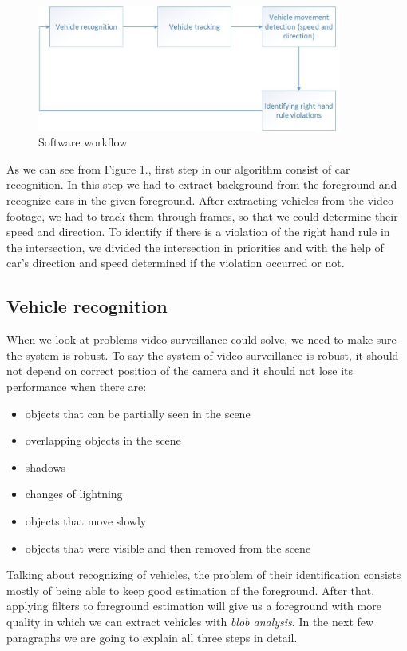 \documentclass[12pt]{article} %
\begin{document}
\begin{figure}[ht]
\centering
\includegraphics[width=10cm]{Drawing1.jpg}
\caption{Software workflow}
\label{fig:workflow}
\end{figure}

As we can see from Figure 1., first step in our algorithm consist of car recognition. In this step we had to extract background from the foreground and recognize cars in the given foreground. After extracting vehicles from the video footage, we had to track them through frames, so that we could determine their speed and direction. To identify if there is a violation of the right hand rule in the intersection, we divided the intersection in priorities and with the help of car's direction and speed determined if the violation occurred or not.


\subsection{Vehicle recognition} %

When we look at problems video surveillance could solve, we need to make sure the system is robust. To say the system of video surveillance is robust, it should not depend on correct position of the camera and it should not lose its performance when there are:

\begin{itemize}
\item objects that can be partially seen in the scene
\item overlapping objects in the scene
\item shadows
\item changes of lightning
\item objects that move slowly
\item objects that were visible and then removed from the scene
\end{itemize}

Talking about recognizing of vehicles, the problem of their identification consists mostly of being able to keep good estimation of the foreground. After that, applying filters to foreground estimation will give us a foreground with more quality in which we can extract vehicles with \textit{blob analysis}.
In the next few paragraphs we are going to explain all three steps in detail.
\end{document}
